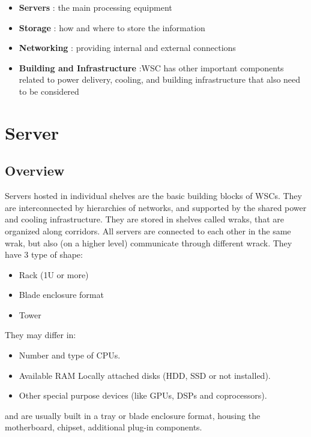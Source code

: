 \documentclass[10pt, oneside]{article}
\begin{document}
\begin{itemize}
    \item \color{green}\textbf{Servers}\color{black}
    : the main processing equipment
    
    \item \color{yellow}\textbf{Storage}\color{black}
    : how and where to store the information
    \item \color{blue}\textbf{Networking}\color{black}
    : providing internal and external connections
    \item \color{red}\textbf{Building and Infrastructure}\color{black}
    :WSC has other important components related to power delivery, cooling, and building infrastructure that also need to be considered
\end{itemize}




\newpage
\section{Server}
\subsection{Overview}
Servers hosted in individual shelves are the basic building blocks of WSCs. They are interconnected by hierarchies of networks, and supported by the shared power and cooling infrastructure. They are stored in  shelves called wraks, that are organized along corridors. All servers are connected to each other in the same wrak, but also (on a higher level) communicate through different wrack.
 They have 3 type of shape:
    \begin{itemize}
        \item Rack (1U or more)
        \item Blade enclosure format 
        \item Tower
    \end{itemize} 
    They may differ in: 
    \begin{itemize}
        \item Number and type of CPUs.
        \item Available RAM Locally attached disks (HDD, SSD or not installed).
        \item Other special purpose devices (like GPUs, DSPs and coprocessors).
    \end{itemize}  
and are usually built in a tray or blade enclosure format, housing the motherboard, chipset, additional plug-in components.
\end{document}
